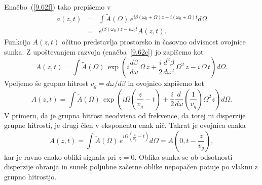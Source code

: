Enačbo~(\ref{9.62f}) tako prepišemo v 
\begin{eqnarray}
a\left(z,t\right)&=&\int \tilde{A}(\Omega)\, e^{i \beta (\omega_0 + \Omega)z - 
i(\omega_0 + \Omega) t}d\Omega\\
& = & e^{i \beta (\omega_0)z - i\omega_0 t} A(z,t).
\label{9.62b}
\end{eqnarray}
Funkcija $A(z, t)$ očitno predstavlja prostorsko in časovno odvisnost ovojnice sunka. Z upoštevanjem
razvoja (enačba~\ref{9.62c}) jo zapišemo kot 
\begin{equation}
 A(z,t) = \int \tilde{A}(\Omega)\, \exp \left(i \frac{d\beta}{d\omega}\, 
 \Omega\,z + \frac{i}{2}\frac{d^2 \beta}{d\omega^2}
 \,\Omega^2\, z - i\, \Omega\, t\right) d\Omega.
\end{equation}
Vpeljemo še grupno hitrost $v_g = d\omega/d\beta$ in ovojnico zapišemo kot
\begin{equation}
 A(z,t) = \int \tilde{A}(\Omega)\, \exp \left(i \Omega \left(\frac{z}{v_g}-t\right)+ 
 \frac{i}{2}\frac{d}{d\omega}
 \left(\frac{1}{v_g}\right)\Omega^2 z\right) d\Omega.
 \label{9.ovoj}
\end{equation}
V primeru, da je grupna hitrost neodvisna od frekvence, da torej ni disperzije grupne hitrosti, 
je drugi člen v eksponentu enak nič. Takrat je ovojnica enaka 
\begin{equation}
  A(z,t) = \int \tilde{A}(\Omega)\, e^{i \Omega \left(\frac{z}{v_g}-t\right)} d\Omega =
  A\left(0,t-\frac{z}{v_g}\right),
\end{equation}
kar je ravno enako obliki signala pri $z = 0$. Oblika sunka se ob odsotnosti 
disperzije ohranja in sunek 
poljubne začetne oblike nepopačen potuje po vlaknu z grupno hitrostjo. 

